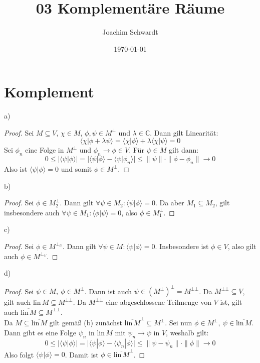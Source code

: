 \documentclass[a4paper,12pt]{article}
\newcommand{\brak}{}
\begin{document}
\title{03 Komplementäre Räume}
\author{Joachim Schwardt}
\date{\today}
\maketitle

\section{Komplement}
a)
\begin{proof}
Sei $M\subseteq V$, $\chi\in M$, $\phi,\psi\in M^\bot$ und $\lambda\in\mathbb{C}$. Dann gilt Linearität:
$$\brak\langle {\chi}| {\phi+\lambda\psi}\rangle=\brak\langle {\chi}| {\phi}\rangle+\lambda\brak\langle {\chi}| {\psi}\rangle=0$$
Sei $\phi_n$ eine Folge in $M^\bot$ und $\phi_n\rightarrow\phi\in V$. Für $\psi\in M$ gilt dann:
$$0\le |\brak\langle {\psi}| {\phi}\rangle|=|\brak\langle {\psi}| {\phi}\rangle-\brak\langle {\psi}| {\phi_n}\rangle|\le \|\psi\|\cdot\|\phi-\phi_n\|\rightarrow 0$$
Also ist $\brak\langle {\psi}| {\phi}\rangle=0$ und somit $\phi\in M^\bot$.
\end{proof}
b)
\begin{proof}
Sei $\phi\in M_2^\bot$. Dann gilt $\forall\psi\in M_2:\brak\langle {\psi}| {\phi}\rangle=0$. Da aber $M_1\subseteq M_2$, gilt insbesondere auch $\forall\psi\in M_1:\brak\langle {\phi}| {\psi}\rangle=0$, also $\phi\in M_1^\bot$.
\end{proof}
c)
\begin{proof}
Sei $\phi\in M^{\bot_U}$. Dann gilt $\forall\psi\in M:\brak\langle {\psi}| {\phi}\rangle=0$. Insbesondere ist $\phi\in V$, also gilt auch $\phi\in M^{\bot_V}$. 
\end{proof}
d)
\begin{proof}
Sei $\psi\in M,\ \phi\in M^\bot$. Dann ist auch $\psi\in (M^\bot)^\bot=M^{\bot\bot}$. Da $M^{\bot\bot}\subseteq V$, gilt auch $\mathrm{lin\,}M\subseteq M^{\bot\bot}$. Da $M^{\bot\bot}$ eine abgeschlossene Teilmenge von $V$ ist, gilt auch $\overline{ \mathrm{lin\,}M} \subseteq M^{\bot\bot}$. \\
Da $M\subseteq \overline{\mathrm{lin\,}M}$ gilt gemäß (b) zunächst $\overline{\mathrm{lin\,}M}^\bot\subseteq M^\bot$. Sei nun $\phi\in M^\bot,\ \psi\in\overline{\mathrm{lin\,}M}$. Dann gibt es eine Folge $\psi_n$ in lin\,$M$ mit $\psi_n\rightarrow\psi$ in $V$, weshalb gilt:
$$0\le |\brak\langle {\psi}| {\phi}\rangle|=|\brak\langle {\psi}| {\phi}\rangle-\brak\langle {\psi_n}| {\phi}\rangle|\le\|\psi-\psi_n\|\cdot\|\phi\|\rightarrow 0$$
Also folgt $\brak\langle {\psi}| {\phi}\rangle=0$. Damit ist $\phi\in\overline{\mathrm{lin\,}M}^\bot$.
\end{proof}
\end{document}
